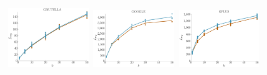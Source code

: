 \documentclass[a4paper]{report}
\newcommand{\wratio}{0.16}
\begin{document}
\vfill
\includegraphics[width=\wratio\textwidth]{maxcut/GNUTELLA/fs_gnutella}\hfill
\includegraphics[width=\wratio\textwidth]{maxcut/GOOGLE/fs_google}\hfill
\includegraphics[width=\wratio\textwidth]{maxcut/GPLUS/fs_gplus}\hfill
\end{document}
